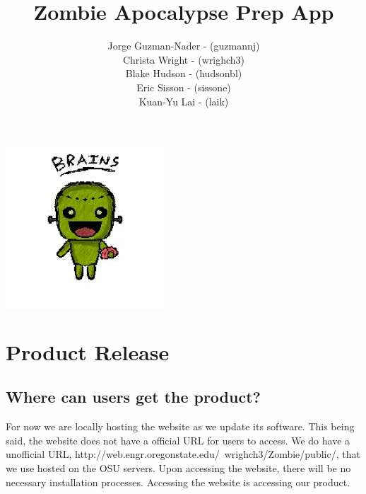 \documentclass[a4paper]{article}
\title{Zombie Apocalypse Prep App  }
\author{Jorge Guzman-Nader - (guzmannj)\\ Christa Wright - (wrighch3)\\ Blake Hudson - (hudsonbl)\\ Eric Sisson -  (sissone)\\ Kuan-Yu Lai - (laik)}
\begin{document}
\maketitle
\includegraphics[width=\textwidth]{index.jpg}
\pagebreak
\tableofcontents
\pagebreak

\section{Product Release}
\subsection{Where can users get the product?}
For now we are locally hosting the website as we update its software. This being said, the website does not have a official URL for users to access. We do have a unofficial URL, http://web.engr.oregonstate.edu/~wrighch3/Zombie/public/, that we use hosted on the OSU servers. Upon accessing the website, there will be no necessary installation processes. Accessing the website is accessing our product.\\
\end{document}
